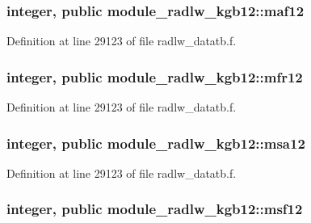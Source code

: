 \subsubsection[{\texorpdfstring{maf12}{maf12}}]{\setlength{\rightskip}{0pt plus 5cm}integer, public module\+\_\+radlw\+\_\+kgb12\+::maf12}\hypertarget{namespacemodule__radlw__kgb12_a9d7c05182e21605108bd65f47bb5569c}{}\label{namespacemodule__radlw__kgb12_a9d7c05182e21605108bd65f47bb5569c}


Definition at line 29123 of file radlw\+\_\+datatb.\+f.

\subsubsection[{\texorpdfstring{mfr12}{mfr12}}]{\setlength{\rightskip}{0pt plus 5cm}integer, public module\+\_\+radlw\+\_\+kgb12\+::mfr12}\hypertarget{namespacemodule__radlw__kgb12_acd751a2e48d0286e3d25a9b658a8367a}{}\label{namespacemodule__radlw__kgb12_acd751a2e48d0286e3d25a9b658a8367a}


Definition at line 29123 of file radlw\+\_\+datatb.\+f.

\subsubsection[{\texorpdfstring{msa12}{msa12}}]{\setlength{\rightskip}{0pt plus 5cm}integer, public module\+\_\+radlw\+\_\+kgb12\+::msa12}\hypertarget{namespacemodule__radlw__kgb12_ad1ddd94fe11b11485502d1fe6f5a1615}{}\label{namespacemodule__radlw__kgb12_ad1ddd94fe11b11485502d1fe6f5a1615}


Definition at line 29123 of file radlw\+\_\+datatb.\+f.

\subsubsection[{\texorpdfstring{msf12}{msf12}}]{\setlength{\rightskip}{0pt plus 5cm}integer, public module\+\_\+radlw\+\_\+kgb12\+::msf12}\hypertarget{namespacemodule__radlw__kgb12_a3282a15ee0faaafd65509536a59e5b4f}{}\label{namespacemodule__radlw__kgb12_a3282a15ee0faaafd65509536a59e5b4f}


